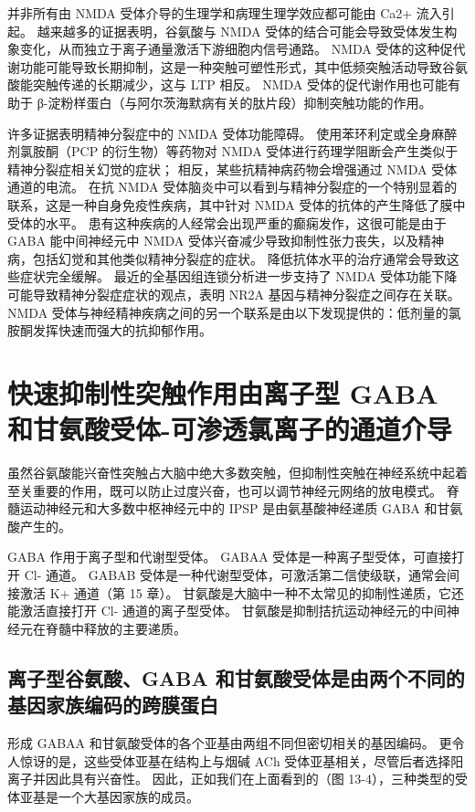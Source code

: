 并非所有由 NMDA 受体介导的生理学和病理生理学效应都可能由 Ca2+ 流入引起。 越来越多的证据表明，谷氨酸与 NMDA 受体的结合可能会导致受体发生构象变化，从而独立于离子通量激活下游细胞内信号通路。 NMDA 受体的这种促代谢功能可能导致长期抑制，这是一种突触可塑性形式，其中低频突触活动导致谷氨酸能突触传递的长期减少，这与 LTP 相反。 NMDA 受体的促代谢作用也可能有助于 β-淀粉样蛋白（与阿尔茨海默病有关的肽片段）抑制突触功能的作用。

许多证据表明精神分裂症中的 NMDA 受体功能障碍。 使用苯环利定或全身麻醉剂氯胺酮（PCP 的衍生物）等药物对 NMDA 受体进行药理学阻断会产生类似于精神分裂症相关幻觉的症状； 相反，某些抗精神病药物会增强通过 NMDA 受体通道的电流。 在抗 NMDA 受体脑炎中可以看到与精神分裂症的一个特别显着的联系，这是一种自身免疫性疾病，其中针对 NMDA 受体的抗体的产生降低了膜中受体的水平。 患有这种疾病的人经常会出现严重的癫痫发作，这很可能是由于 GABA 能中间神经元中 NMDA 受体兴奋减少导致抑制性张力丧失，以及精神病，包括幻觉和其他类似精神分裂症的症状。 降低抗体水平的治疗通常会导致这些症状完全缓解。 最近的全基因组连锁分析进一步支持了 NMDA 受体功能下降可能导致精神分裂症症状的观点，表明 NR2A 基因与精神分裂症之间存在关联。 NMDA 受体与神经精神疾病之间的另一个联系是由以下发现提供的：低剂量的氯胺酮发挥快速而强大的抗抑郁作用。


\section{快速抑制性突触作用由离子型 GABA 和甘氨酸受体-可渗透氯离子的通道介导}
虽然谷氨酸能兴奋性突触占大脑中绝大多数突触，但抑制性突触在神经系统中起着至关重要的作用，既可以防止过度兴奋，也可以调节神经元网络的放电模式。 脊髓运动神经元和大多数中枢神经元中的 IPSP 是由氨基酸神经递质 GABA 和甘氨酸产生的。

GABA 作用于离子型和代谢型受体。 GABAA 受体是一种离子型受体，可直接打开 Cl- 通道。 GABAB 受体是一种代谢型受体，可激活第二信使级联，通常会间接激活 K+ 通道（第 15 章）。 甘氨酸是大脑中一种不太常见的抑制性递质，它还能激活直接打开 Cl- 通道的离子型受体。 甘氨酸是抑制拮抗运动神经元的中间神经元在脊髓中释放的主要递质。

\subsection{离子型谷氨酸、GABA 和甘氨酸受体是由两个不同的基因家族编码的跨膜蛋白}
形成 GABAA 和甘氨酸受体的各个亚基由两组不同但密切相关的基因编码。 更令人惊讶的是，这些受体亚基在结构上与烟碱 ACh 受体亚基相关，尽管后者选择阳离子并因此具有兴奋性。 因此，正如我们在上面看到的（图 13-4），三种类型的受体亚基是一个大基因家族的成员。

